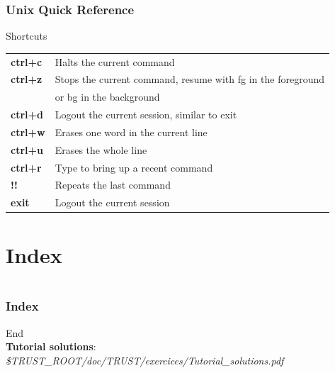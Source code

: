 \documentclass[10pt, hyperref={unicode=true,pdfusetitle, bookmarks=true,bookmarksnumbered=false,bookmarksopen=false, breaklinks=false,pdfborder={0 0 1},backref=true,colorlinks=true,linkcolor=darkblue,pageanchor}]{beamer}
\begin{document}
\begin{frame}
\frametitle{Unix Quick Reference}
\begin{block}{Shortcuts}

\begin{tabular}{ll}
\textbf{ctrl+c} & Halts the current command                                     \tabularnewline
\textbf{ctrl+z} & Stops the current command, resume with fg in the foreground   \tabularnewline
                & or bg in the background                                       \tabularnewline
\textbf{ctrl+d} & Logout the current session, similar to exit                   \tabularnewline
\textbf{ctrl+w} & Erases one word in the current line                           \tabularnewline
\textbf{ctrl+u} & Erases the whole line                                         \tabularnewline
\textbf{ctrl+r} & Type to bring up a recent command                             \tabularnewline
\textbf{!!}     & Repeats the last command                                      \tabularnewline
\textbf{exit}   & Logout the current session                                    \tabularnewline
\end{tabular}

\end{block}
\end{frame}


\section{{\bf{Index}}}
\begin{frame}
\begin{columns}[c] 
\tableofcontents[sections={1-9},currentsection, currentsubsection]
\tableofcontents[sections={10-16},currentsection, currentsubsection]
\end{columns}
\end{frame}
\begin{frame}[allowframebreaks]
\frametitle{Index}
\printindex
\end{frame}


\begin{frame}
\begin{center}
{\Huge{End}}\\
\vspace{2cm}
\textbf{Tutorial solutions}: \textit{\$TRUST\_ROOT/doc/TRUST/exercices/Tutorial\_solutions.pdf}
\end{center}
\end{frame}
\end{document}
